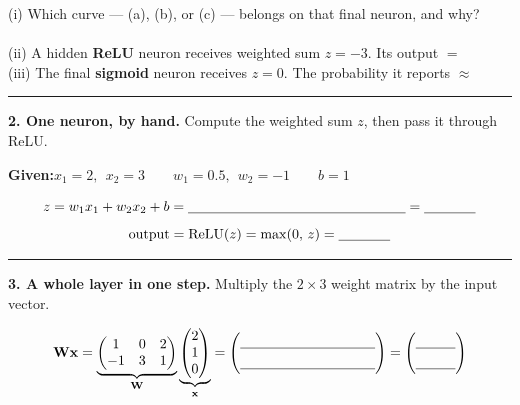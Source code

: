 \documentclass[11pt]{article}
\newif\ifsolution
\newcommand{\blk}[1]{\underline{\hspace{#1}}}
\newcommand{\rb}[2]{\ifsolution\textbf{#1}\else\blk{#2}\fi}
\newcommand{\keybox}[1]{\ifsolution\par\vspace{2pt}%
  \fbox{\parbox{0.965\textwidth}{\small\textbf{Answer.}\; #1}}\par\fi}
\newcommand{\work}[1]{\ifsolution\else\vspace{#1}\fi}
\begin{document}
\vspace{4pt}
{\small (i) Which curve --- (a), (b), or (c) --- belongs on that final neuron, and why?}\\[2pt]
\hspace*{1.5em}\rb{(a) Sigmoid --- its output is squeezed into $(0,1)$, so it reads as a probability}{10.5cm}\\[6pt]
{\small (ii) A hidden \textbf{ReLU} neuron receives weighted sum $z=-3$. Its output $=$}\;\; \rb{$0$}{1.6cm}\\[6pt]
{\small (iii) The final \textbf{sigmoid} neuron receives $z=0$. The probability it reports $\approx$}\;\; \rb{$0.5$}{1.6cm}

\keybox{(i) Curve \textbf{(a), the sigmoid} --- it is the only activation whose output is bounded
to $(0,1)$, so it can be read as a probability; ReLU is unbounded above and the linear line is
unbounded both ways, so neither can report a probability. (ii) $\operatorname{ReLU}(-3)=\max(0,-3)=0$
--- the neuron is silent. (iii) $\operatorname{sigmoid}(0)=1/(1+e^{0})=1/2=0.5$ --- maximally
uncertain, a coin flip.}

\vspace{2pt}\hrule\vspace{5pt}

\textbf{2. One neuron, by hand.}\; {\small Compute the weighted sum $z$, then pass it through
ReLU.}

\vspace{2pt}
\textbf{Given:}\quad $x_1 = 2,\ \ x_2 = 3 \qquad w_1 = 0.5,\ \ w_2 = -1 \qquad b = 1$

\[
z = w_1 x_1 + w_2 x_2 + b = \blk{5.5cm} = \rb{$-1$}{1.3cm}
\]
\[
\text{output} = \operatorname{ReLU}(z) = \max(0,\,z) = \rb{$0$}{1.3cm}
\]

\work{0.9cm}

\keybox{$z = (0.5)(2) + (-1)(3) + 1 = 1 - 3 + 1 = -1$, so
$\operatorname{ReLU}(-1) = \max(0,-1) = 0$. ReLU clips the negative sum to zero: for this
input the neuron stays silent.}

\vspace{2pt}\hrule\vspace{5pt}

\textbf{3. A whole layer in one step.}\; {\small Multiply the $2\times3$ weight matrix by the
input vector.}

\[
\mathbf{W}\mathbf{x} =
\underbrace{\begin{pmatrix} 1 & 0 & 2 \\ -1 & 3 & 1 \end{pmatrix}}_{\mathbf{W}}
\underbrace{\begin{pmatrix} 2 \\ 1 \\ 0 \end{pmatrix}}_{\mathbf{x}}
= \begin{pmatrix} \blk{3.4cm} \\[3pt] \blk{3.4cm} \end{pmatrix}
= \begin{pmatrix} \rb{$2$}{1cm} \\[3pt] \rb{$1$}{1cm} \end{pmatrix}
\]
\end{document}
